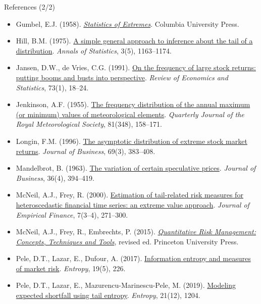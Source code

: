 \begin{frame}{References (2/2)}
\itemsize{\tiny}
\begin{itemize}
    \item Gumbel, E.J. (1958). \href{https://doi.org/10.7312/gumb92958}{\textit{Statistics of Extremes}}. Columbia University Press.
    \item Hill, B.M. (1975). \href{https://doi.org/10.1214/aos/1176343247}{A simple general approach to inference about the tail of a distribution}. \textit{Annals of Statistics}, 3(5), 1163--1174.
    \item Jansen, D.W., de Vries, C.G. (1991). \href{https://doi.org/10.2307/2109682}{On the frequency of large stock returns: putting booms and busts into perspective}. \textit{Review of Economics and Statistics}, 73(1), 18--24.
    \item Jenkinson, A.F. (1955). \href{https://doi.org/10.1002/qj.49708134804}{The frequency distribution of the annual maximum (or minimum) values of meteorological elements}. \textit{Quarterly Journal of the Royal Meteorological Society}, 81(348), 158--171.
    \item Longin, F.M. (1996). \href{https://doi.org/10.1086/209695}{The asymptotic distribution of extreme stock market returns}. \textit{Journal of Business}, 69(3), 383--408.
    \item Mandelbrot, B. (1963). \href{https://doi.org/10.1086/294632}{The variation of certain speculative prices}. \textit{Journal of Business}, 36(4), 394--419.
    \item McNeil, A.J., Frey, R. (2000). \href{https://doi.org/10.1016/S0927-5398(00)00012-8}{Estimation of tail-related risk measures for heteroscedastic financial time series: an extreme value approach}. \textit{Journal of Empirical Finance}, 7(3--4), 271--300.
    \item McNeil, A.J., Frey, R., Embrechts, P. (2015). \href{https://press.princeton.edu/books/hardcover/9780691166278/quantitative-risk-management}{\textit{Quantitative Risk Management: Concepts, Techniques and Tools}}, revised ed. Princeton University Press.
    \item Pele, D.T., Lazar, E., Dufour, A. (2017). \href{https://doi.org/10.3390/e19050226}{Information entropy and measures of market risk}. \textit{Entropy}, 19(5), 226.
    \item Pele, D.T., Lazar, E., Mazurencu-Marinescu-Pele, M. (2019). \href{https://doi.org/10.3390/e21121204}{Modeling expected shortfall using tail entropy}. \textit{Entropy}, 21(12), 1204.

\end{itemize}
\end{frame}
